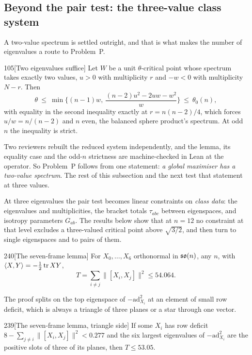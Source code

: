 \subsection{Beyond the pair test: the three-value class system}\label{sec:classsystem}

A two-value spectrum is settled outright, and that is what makes the number of eigenvalues a route to Problem~P.

\begin{Lem}{105}[Two eigenvalues suffice]
Let $W$ be a unit $\theta$-critical point whose spectrum takes exactly two values, $u>0$ with multiplicity $r$ and $-w<0$ with multiplicity $N-r$. Then
\[
\theta\ \le\ \min\Big\{(n-1)w,\ \frac{(n-2)u^2-2uw-w^2}{w}\Big\}\ \le\ \theta_0(n),
\]
with equality in the second inequality exactly at $r=n(n-2)/4$, which forces $u/w=n/(n-2)$ and $n$ even, the balanced sphere product's spectrum. At odd $n$ the inequality is strict.
\end{Lem}

Two reviewers rebuilt the reduced system independently, and the lemma, its equality case and the odd-$n$ strictness are machine-checked in Lean at the operator. So Problem~P follows from one statement: \emph{a global maximiser has a two-value spectrum}. The rest of this subsection and the next test that statement at three values.

At three eigenvalues the pair test becomes linear constraints on \emph{class data}: the eigenvalues and multiplicities, the bracket totals $\tau_{abc}$ between eigenspaces, and isotropy parameters $G_{ab}$. The results below show that at $n=12$ no constraint at that level excludes a three-valued critical point above $\sqrt{3/2}$, and then turn to single eigenspaces and to pairs of them.

\begin{Lem}{240}[The seven-frame lemma]
For $X_0,\dots,X_6$ orthonormal in $\mathfrak{so}(n)$, any $n$, with $\langle X,Y\rangle=-\tfrac12\operatorname{tr} XY$,
\[
T=\sum_{i\ne j}\lVert[X_i,X_j]\rVert^2\le54.064 .
\]
\end{Lem}

The proof splits on the top eigenspace of $-\mathrm{ad}_{X_i}^2$ at an element of small row deficit, which is always a triangle of three planes or a star through one vector.

\begin{Lem}{239}[The seven-frame lemma, triangle side]
If some $X_i$ has row deficit $8-\sum_{j\ne i}\lVert[X_i,X_j]\rVert^2<0.277$ and the six largest eigenvalues of $-\mathrm{ad}_{X_i}^2$ are the positive slots of three of its planes, then $T\le53.05$.
\end{Lem}

